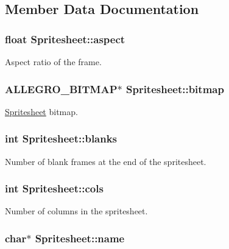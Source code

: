 \subsection{\-Member \-Data \-Documentation}
\hypertarget{structSpritesheet_a85c93c8d80227725374e1581c4c8e049}{
\subsubsection[{aspect}]{\setlength{\rightskip}{0pt plus 5cm}float {\bf \-Spritesheet\-::aspect}}}\label{structSpritesheet_a85c93c8d80227725374e1581c4c8e049}
\-Aspect ratio of the frame. \hypertarget{structSpritesheet_ad31be6e59349586862e6a813ea139bcb}{
\subsubsection[{bitmap}]{\setlength{\rightskip}{0pt plus 5cm}\-A\-L\-L\-E\-G\-R\-O\-\_\-\-B\-I\-T\-M\-A\-P$\ast$ {\bf \-Spritesheet\-::bitmap}}}\label{structSpritesheet_ad31be6e59349586862e6a813ea139bcb}
\hyperlink{structSpritesheet}{\-Spritesheet} bitmap. \hypertarget{structSpritesheet_a5010b18959949b1c577078f94a810ef3}{
\subsubsection[{blanks}]{\setlength{\rightskip}{0pt plus 5cm}int {\bf \-Spritesheet\-::blanks}}}\label{structSpritesheet_a5010b18959949b1c577078f94a810ef3}
\-Number of blank frames at the end of the spritesheet. \hypertarget{structSpritesheet_a3d512755ce492a35e1816fe026cc37c9}{
\subsubsection[{cols}]{\setlength{\rightskip}{0pt plus 5cm}int {\bf \-Spritesheet\-::cols}}}\label{structSpritesheet_a3d512755ce492a35e1816fe026cc37c9}
\-Number of columns in the spritesheet. \hypertarget{structSpritesheet_a6788d53f825bd74cda7e50e75435befa}{
\subsubsection[{name}]{\setlength{\rightskip}{0pt plus 5cm}char$\ast$ {\bf \-Spritesheet\-::name}}}\label{structSpritesheet_a6788d53f825bd74cda7e50e75435befa}
